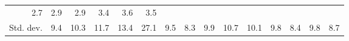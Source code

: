 \begin{tabular}{lllllllllllllll}
  \multicolumn{1}{r}{2.7} &
  \multicolumn{1}{r}{2.9} &
  \multicolumn{1}{r}{2.9} &
  \multicolumn{1}{r}{3.4} &
  \multicolumn{1}{r}{3.6} &
  \multicolumn{1}{r}{3.5} \\
\multicolumn{1}{l}{\hspace{2em}Std. dev.} &
  \multicolumn{1}{|r}{9.4} &
  \multicolumn{1}{r}{10.3} &
  \multicolumn{1}{r}{11.7} &
  \multicolumn{1}{r}{13.4} &
  \multicolumn{1}{r}{27.1} &
  \multicolumn{1}{r}{9.5} &
  \multicolumn{1}{r}{8.3} &
  \multicolumn{1}{r}{9.9} &
  \multicolumn{1}{r}{10.7} &
  \multicolumn{1}{r}{10.1} &
  \multicolumn{1}{r}{9.8} &
  \multicolumn{1}{r}{8.4} &
  \multicolumn{1}{r}{9.8} &
  \multicolumn{1}{r}{8.7} \\
\cline{1-15}
\end{tabular}
